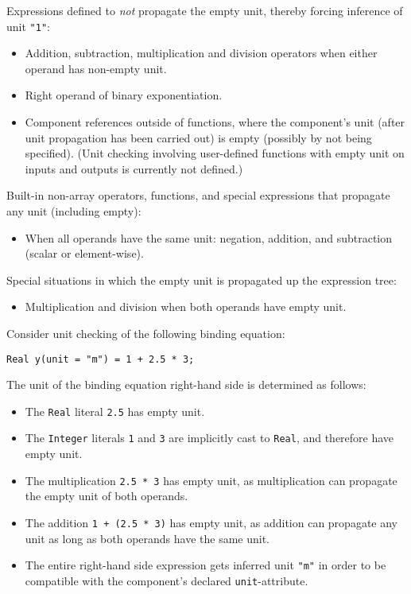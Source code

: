 Expressions defined to \emph{not} propagate the empty unit, thereby forcing inference of unit \lstinline!"1"!:
\begin{itemize}
\item
  Addition, subtraction, multiplication and division operators when either operand has non-empty unit.
\item
  Right operand of binary exponentiation.
\item
  Component references outside of functions, where the component's unit (after unit propagation has been carried out) is empty (possibly by not being specified).
  (Unit checking involving user-defined functions with empty unit on inputs and outputs is currently not defined.)
\end{itemize}

Built-in non-array operators, functions, and special expressions that propagate any unit (including empty):
\begin{itemize}
\item
  When all operands have the same unit: negation, addition, and subtraction (scalar or element-wise).
\end{itemize}

Special situations in which the empty unit is propagated up the expression tree:
\begin{itemize}
\item
  Multiplication and division when both operands have empty unit.
\end{itemize}

\begin{example}
Consider unit checking of the following binding equation:
\begin{lstlisting}[language=modelica]
Real y(unit = "m") = 1 + 2.5 * 3;
\end{lstlisting}
The unit of the binding equation right-hand side is determined as follows:
\begin{itemize}
\item The \lstinline!Real! literal \lstinline!2.5! has empty unit.
\item The \lstinline!Integer! literals \lstinline!1! and \lstinline!3! are implicitly cast to \lstinline!Real!, and therefore have empty unit.
\item The multiplication \lstinline!2.5 * 3! has empty unit, as multiplication can propagate the empty unit of both operands.
\item The addition \lstinline!1 + (2.5 * 3)! has empty unit, as addition can propagate any unit as long as both operands have the same unit.
\item The entire right-hand side expression gets inferred unit \lstinline!"m"! in order to be compatible with the component's declared \lstinline!unit!-attribute.
\end{itemize}
\end{example}

